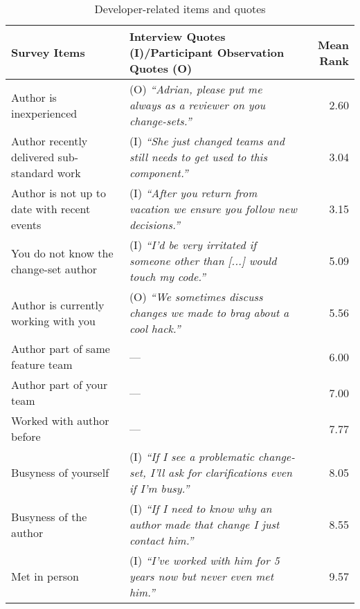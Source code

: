\begin{sidewaystable}
\small
\centering
\caption{Developer-related items and quotes}
\begin{tabular}{l@{\hspace{5pt}}l@{\hspace{-10pt}}r}
\toprule
Survey Items & Interview Quotes (I)/Participant Observation Quotes (O) & Mean Rank\\
\midrule
Author is inexperienced &(O) \emph{``Adrian, please put me always as a reviewer on you change-sets.''}& 2.60\\%
Author recently delivered sub-standard work&(I) \emph{``She just changed teams and still needs to get used to this component.''}& 3.04\\%
Author is not up to date with recent events &(I) \emph{``After you return from vacation we ensure you follow new decisions.''}& 3.15\\%
You do not know the change-set author &(I) \emph{``I'd be very irritated if someone other than [...] would touch my code.''}& 5.09\\%
Author is currently working with you &(O) \emph{``We sometimes discuss changes we made to brag about a cool hack.''}& 5.56\\%
Author part of same feature team &--- & 6.00\\%
Author part of your team &--- & 7.00\\%
Worked with author before &--- & 7.77\\%
Busyness of yourself &(I) \emph{``If I see a problematic change-set, I'll ask for clarifications even if I'm busy.''}& 8.05\\%
Busyness of the author &(I) {\small\emph{``If I need to know why an author made that change I just contact him.''}}& 8.55\\%
Met in person &(I) \emph{``I've worked with him for 5 years now but never even met him.''}& 9.57\\%

\end{tabular}
\end{sidewaystable}
